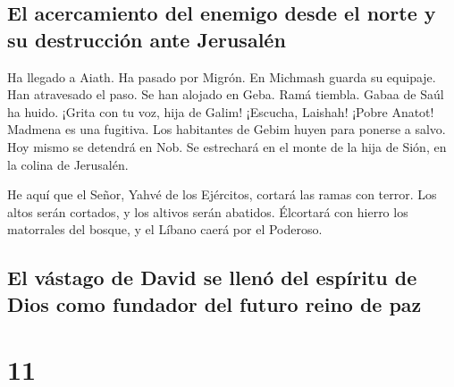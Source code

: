 \hypertarget{el-acercamiento-del-enemigo-desde-el-norte-y-su-destrucciuxf3n-ante-jerusaluxe9n}{%
\subsection{El acercamiento del enemigo desde el norte y su destrucción
ante
Jerusalén}\label{el-acercamiento-del-enemigo-desde-el-norte-y-su-destrucciuxf3n-ante-jerusaluxe9n}}

 Ha llegado a Aiath. Ha pasado por Migrón. En Michmash
guarda su equipaje.  Han atravesado el paso. Se han
alojado en Geba. Ramá tiembla. Gabaa de Saúl ha huido. 
¡Grita con tu voz, hija de Galim! ¡Escucha, Laishah! ¡Pobre Anatot!
 Madmena es una fugitiva. Los habitantes de Gebim huyen
para ponerse a salvo.  Hoy mismo se detendrá en Nob. Se
estrechará en el monte de la hija de Sión, en la colina de Jerusalén.

 He aquí que el Señor, Yahvé de los Ejércitos, cortará
las ramas con terror. Los altos serán cortados, y los altivos serán
abatidos.  Élcortará con hierro los matorrales del
bosque, y el Líbano caerá por el Poderoso.

\hypertarget{el-vuxe1stago-de-david-se-llenuxf3-del-espuxedritu-de-dios-como-fundador-del-futuro-reino-de-paz}{%
\subsection{El vástago de David se llenó del espíritu de Dios como
fundador del futuro reino de
paz}\label{el-vuxe1stago-de-david-se-llenuxf3-del-espuxedritu-de-dios-como-fundador-del-futuro-reino-de-paz}}

\hypertarget{section-10}{%
\section{11}\label{section-10}}

